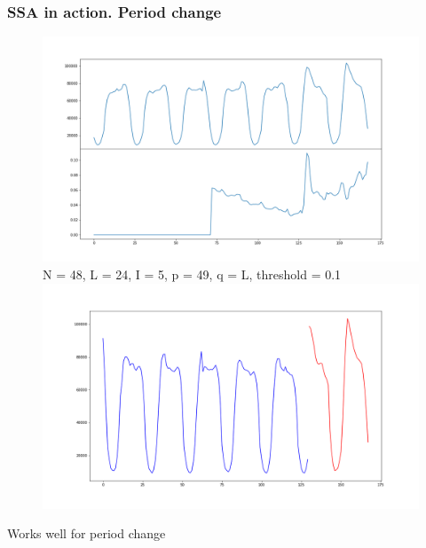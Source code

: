 \documentclass[intlimits, 9pt, unicode]{beamer}
\begin{document}
\begin{frame}
    \frametitle{SSA in action. Period change}

\begin{figure}
	\includegraphics[scale=0.10]{images/025_period_cp}
	N = 48, L = 24, I = 5, p = 49, q = L, threshold = 0.1
	\includegraphics[scale=0.10]{images/026_period_cp_detected}
\end{figure}

Works well for period change

\end{frame}
\end{document}
